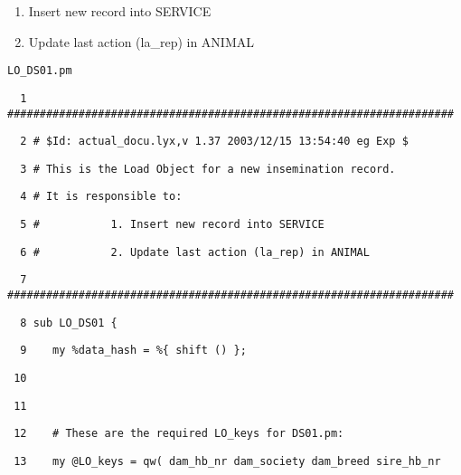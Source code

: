 \begin{enumerate}
\item Insert new record into SERVICE 
\item Update last action (la\_rep) in ANIMAL
\end{enumerate}
%
\begin{table}[htbp]

\caption{\texttt{\small LO\_DS01.pm\label{tab:LO-DS01.pm}}}

\texttt{\small ~ 1 \#\#\#\#\#\#\#\#\#\#\#\#\#\#\#\#\#\#\#\#\#\#\#\#\#\#\#\#\#\#\#\#\#\#\#\#\#\#\#\#\#\#\#\#\#\#\#\#\#\#\#\#\#\#\#\#\#\#\#\#\#\#\#\#\#\#\#\#\#}{\small \par}

\texttt{\small ~ 2 \# \$Id: actual\_docu.lyx,v 1.37 2003/12/15 13:54:40
eg Exp \$}{\small \par}

\texttt{\small ~ 3 \# This is the Load Object for a new insemination
record.}{\small \par}

\texttt{\small ~ 4 \# It is responsible to:}{\small \par}

\texttt{\small ~ 5 \#~~~~~~~~~~ 1. Insert new record into
SERVICE}{\small \par}

\texttt{\small ~ 6 \#~~~~~~~~~~ 2. Update last action (la\_rep)
in ANIMAL}{\small \par}

\texttt{\small ~ 7 \#\#\#\#\#\#\#\#\#\#\#\#\#\#\#\#\#\#\#\#\#\#\#\#\#\#\#\#\#\#\#\#\#\#\#\#\#\#\#\#\#\#\#\#\#\#\#\#\#\#\#\#\#\#\#\#\#\#\#\#\#\#\#\#\#\#\#\#\#}{\small \par}

\texttt{\small ~ 8 sub LO\_DS01 \{}{\small \par}

\texttt{\small ~ 9~~~ my \%data\_hash = \%\{ shift () \};}{\small \par}

\texttt{\small ~10~~~ }{\small \par}

\texttt{\small ~11 }{\small \par}

\texttt{\small ~12~~~ \# These are the required LO\_keys for DS01.pm:}{\small \par}

\texttt{\small ~13~~~ my @LO\_keys = qw( dam\_hb\_nr dam\_society
dam\_breed sire\_hb\_nr}{\small \par}


\end{table}
